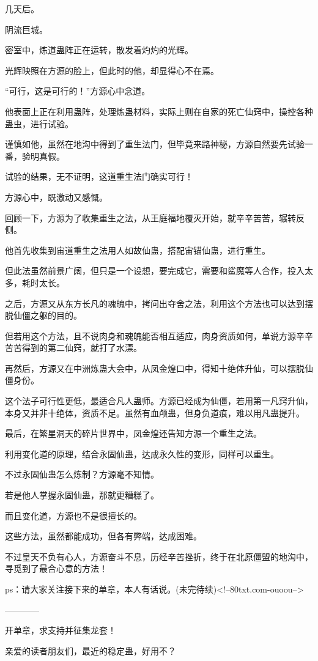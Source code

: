 \begin{this_body}
几天后。

阴流巨城。

密室中，炼道蛊阵正在运转，散发着灼灼的光辉。

光辉映照在方源的脸上，但此时的他，却显得心不在焉。

“可行，这是可行的！”方源心中念道。

他表面上正在利用蛊阵，处理炼蛊材料，实际上则在自家的死亡仙窍中，操控各种蛊虫，进行试验。

谨慎如他，虽然在地沟中得到了重生法门，但毕竟来路神秘，方源自然要先试验一番，验明真假。

试验的结果，无不证明，这道重生法门确实可行！

方源心中，既激动又感慨。

回顾一下，方源为了收集重生之法，从王庭福地覆灭开始，就辛辛苦苦，辗转反侧。

他首先收集到宙道重生之法用人如故仙蛊，搭配宙锚仙蛊，进行重生。

但此法虽然前景广阔，但只是一个设想，要完成它，需要和鲨魔等人合作，投入太多，耗时太长。

之后，方源又从东方长凡的魂魄中，拷问出夺舍之法，利用这个方法也可以达到摆脱仙僵之躯的目的。

但若用这个方法，且不说肉身和魂魄能否相互适应，肉身资质如何，单说方源辛辛苦苦得到的第二仙窍，就打了水漂。

再然后，方源又在中洲炼蛊大会中，从凤金煌口中，得知十绝体升仙，可以摆脱仙僵身份。

这个法子可行性更低，最适合凡人蛊师。方源已经成为仙僵，若用第一凡窍升仙，本身又并非十绝体，资质不足。虽然有血颅蛊，但身负道痕，难以用凡蛊提升。

最后，在繁星洞天的碎片世界中，凤金煌还告知方源一个重生之法。

利用变化道的原理，结合永固仙蛊，达成永久性的变形，同样可以重生。

不过永固仙蛊怎么炼制？方源毫不知情。

若是他人掌握永固仙蛊，那就更糟糕了。

而且变化道，方源也不是很擅长的。

这些方法，虽然都能成功，但各有弊端，达成困难。

不过皇天不负有心人，方源奋斗不息，历经辛苦挫折，终于在北原僵盟的地沟中，寻觅到了最合心意的方法！

ps：请大家关注接下来的单章，本人有话说。(未完待续)<!--80txt.com-ouoou-->

------------

开单章，求支持并征集龙套！

亲爱的读者朋友们，最近的稳定蛊，好用不？


\end{this_body}
